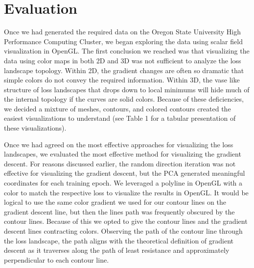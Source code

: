 \documentclass{acmsiggraph}
\begin{document}
\section{Evaluation}
\label{sec:intro}

Once we had generated the required data on the Oregon State University High Performance Computing Cluster, we began exploring the data using scalar field visualization in OpenGL. The first conclusion we reached was that visualizing the data using color maps in both 2D and 3D was not sufficient to analyze the loss landscape topology. Within 2D, the gradient changes are often so dramatic that simple colors do not convey the required information. Within 3D, the vase like structure of loss landscapes that drops down to local minimums will hide much of the internal topology if the curves are solid colors. Because of these deficiencies, we decided a mixture of meshes, contours, and colored contours created the easiest visualizations to understand (see Table 1 for a tabular presentation of these visualizations). 

Once we had agreed on the most effective approaches for visualizing the loss landscapes, we evaluated the most effective method for visualizing the gradient descent. For reasons discussed earlier, the random direction iteration was not effective for visualizing the gradient descent, but the PCA generated meaningful coordinates for each training epoch. We leveraged a polyline in OpenGL with a color to match the respective loss to visualize the results in OpenGL. It would be logical to use the same color gradient we used for our contour lines on the gradient descent line, but then the lines path was frequently obscured by the contour lines. Because of this we opted to give the contour lines and the gradient descent lines contracting colors. Observing the path of the contour line through the loss landscape, the path aligns with the theoretical definition of gradient descent as it traverses along the path of least resistance and approximately perpendicular to each contour line.
\end{document}
